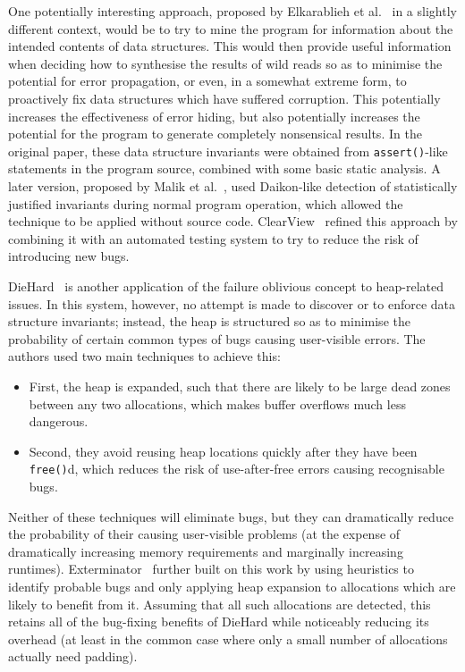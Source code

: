 One potentially interesting approach, proposed by Elkarablieh et
al.~\cite{Elkarablieh2007} in a slightly different context, would be
to try to mine the program for information about the intended contents
of data structures.  This would then provide useful information when
deciding how to synthesise the results of wild reads so as to minimise
the potential for error propagation, or even, in a somewhat extreme
form, to proactively fix data structures which have suffered
corruption.  This potentially increases the effectiveness of error
hiding, but also potentially increases the potential for the program
to generate completely nonsensical results.  In the original paper,
these data structure invariants were obtained from
\verb|assert()|-like statements in the program source, combined with
some basic static analysis.  A later version, proposed by Malik et
al.~\cite{Malik}, used Daikon-like detection of statistically
justified invariants during normal program operation, which allowed
the technique to be applied without source code.
ClearView~\cite{Perkins} refined this approach by combining it with an
automated testing system to try to reduce the risk of introducing new
bugs.

DieHard~\cite{Berger2006} is another application of the failure
oblivious concept to heap-related issues.  In this system, however, no
attempt is made to discover or to enforce data structure invariants;
instead, the heap is structured so as to minimise the probability of
certain common types of bugs causing user-visible errors.  The authors
used two main techniques to achieve this:
\begin{itemize}
\item First, the heap is expanded, such that there are likely to be
  large dead zones between any two allocations, which makes buffer
  overflows much less dangerous.
\item Second, they avoid reusing heap locations quickly after they
  have been \texttt{free()}d, which reduces the risk of use-after-free
  errors causing recognisable bugs.
\end{itemize}
Neither of these techniques will eliminate bugs, but they can
dramatically reduce the probability of their causing user-visible
problems (at the expense of dramatically increasing memory
requirements and marginally increasing runtimes).
Exterminator~\cite{Novark2007} further built on this work by using
heuristics to identify probable bugs and only applying heap
expansion to allocations which are likely to benefit from it.
Assuming that all such allocations are detected, this retains all of
the bug-fixing benefits of DieHard while noticeably reducing its
overhead (at least in the common case where only a small number of
allocations actually need padding).

